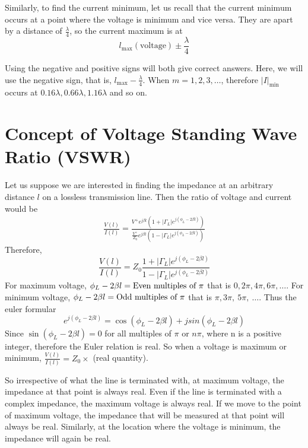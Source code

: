 \begin{exmp}
Similarly, to find the current minimum, let us recall that the current minimum occurs at a point where the voltage is minimum and vice versa. They are apart by a distance of $\frac{\lambda}{4}$, so the current maximum is at
\[
l_\max(\text{voltage})\pm \frac{\lambda}{4}
\]

Using the negative and positive signs will both give correct answers. Here, we will use the negative sign, that is, $l_\max-\frac{\lambda}{4}$. When $m = 1, 2, 3, \ldots$, therefore $|I|_\min$ occurs at $0.16\lambda , 0.66\lambda , 1.16\lambda$ and so on.
\end{exmp}

\section{Concept of Voltage Standing Wave Ratio (VSWR)}
Let us suppose we are interested in finding the impedance at an arbitrary distance $l$ on a lossless transmission line. Then the ratio of voltage and current would be
\begin{align*}
\frac{V(l)}{I(l)} = \frac{V^{+}e^{j\beta l}(1+ |\Gamma_L|e^{j(\phi_L- 2 \beta l)})}{\frac{V^{+}}{Z_0}e^{j\beta l}(1- |\Gamma_L|e^{j(\phi_L- 2\beta l)})}
\end{align*}
Therefore,
\begin{equation*}
\frac{V(l)}{I(l)} = Z_0 \frac{1+ |\Gamma_L|e^{j(\phi_L- 2 \beta l)}}{1- |\Gamma_L|e^{j(\phi_L- 2\beta l)}}
\end{equation*}
For maximum voltage, $\phi_L-2\beta l = \textnormal{Even multiples of }\pi$ that is $0, 2\pi, 4\pi, 6\pi,\ldots$. For minimum voltage, $\phi_L-2\beta l=\textnormal{Odd multiples of } \pi$ that is $\pi, 3\pi,\ 5\pi,\ \ldots$. Thus the euler formular 
\[e^{j(\phi_L - 2 \beta l)} = \cos(\phi_L - 2 \beta l) + jsin(\phi_L - 2 \beta l)\]
Since $\sin(\phi_L - 2 \beta l) = 0$ for all multiples of $\pi$ or $n\pi$, where n is a positive integer, therefore the Euler relation is real. So when a voltage is maximum or minimum, $\frac{V(l)}{I(l)} = Z_0 \times$ (real quantity).

So irrespective of what the line is terminated with, at maximum voltage, the impedance at that point is always real. Even if the line is terminated with a complex impedance, the maximum voltage is always real. If we move to the point of maximum voltage, the impedance that will be measured at that point will always be real. Similarly, at the location where the voltage is minimum, the impedance will again be real.

